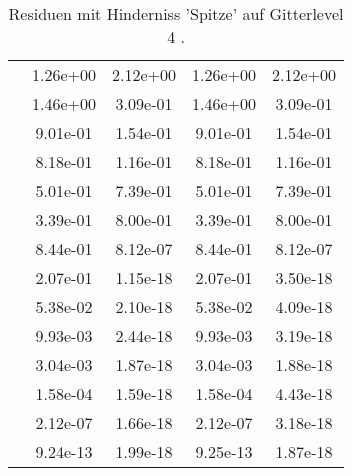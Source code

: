\begin{table}
\begin{tabular}{c|cc|cc|}
\multicolumn{1}{|c|}{} & \multicolumn{1}{|c|}{  1.26e+00} & \multicolumn{1}{|c|}{  2.12e+00} & \multicolumn{1}{|c|}{  1.26e+00} & \multicolumn{1}{|c|}{  2.12e+00} \\ 
\multicolumn{1}{|c|}{} & \multicolumn{1}{|c|}{  1.46e+00} & \multicolumn{1}{|c|}{  3.09e-01} & \multicolumn{1}{|c|}{  1.46e+00} & \multicolumn{1}{|c|}{  3.09e-01} \\ 
\multicolumn{1}{|c|}{} & \multicolumn{1}{|c|}{  9.01e-01} & \multicolumn{1}{|c|}{  1.54e-01} & \multicolumn{1}{|c|}{  9.01e-01} & \multicolumn{1}{|c|}{  1.54e-01} \\ 
\multicolumn{1}{|c|}{} & \multicolumn{1}{|c|}{  8.18e-01} & \multicolumn{1}{|c|}{  1.16e-01} & \multicolumn{1}{|c|}{  8.18e-01} & \multicolumn{1}{|c|}{  1.16e-01} \\ 
\multicolumn{1}{|c|}{} & \multicolumn{1}{|c|}{  5.01e-01} & \multicolumn{1}{|c|}{  7.39e-01} & \multicolumn{1}{|c|}{  5.01e-01} & \multicolumn{1}{|c|}{  7.39e-01} \\ 
\multicolumn{1}{|c|}{} & \multicolumn{1}{|c|}{  3.39e-01} & \multicolumn{1}{|c|}{  8.00e-01} & \multicolumn{1}{|c|}{  3.39e-01} & \multicolumn{1}{|c|}{  8.00e-01} \\ 
\multicolumn{1}{|c|}{} & \multicolumn{1}{|c|}{  8.44e-01} & \multicolumn{1}{|c|}{  8.12e-07} & \multicolumn{1}{|c|}{  8.44e-01} & \multicolumn{1}{|c|}{  8.12e-07} \\ 
\multicolumn{1}{|c|}{} & \multicolumn{1}{|c|}{  2.07e-01} & \multicolumn{1}{|c|}{  1.15e-18} & \multicolumn{1}{|c|}{  2.07e-01} & \multicolumn{1}{|c|}{  3.50e-18} \\ 
\multicolumn{1}{|c|}{} & \multicolumn{1}{|c|}{  5.38e-02} & \multicolumn{1}{|c|}{  2.10e-18} & \multicolumn{1}{|c|}{  5.38e-02} & \multicolumn{1}{|c|}{  4.09e-18} \\ 
\multicolumn{1}{|c|}{} & \multicolumn{1}{|c|}{  9.93e-03} & \multicolumn{1}{|c|}{  2.44e-18} & \multicolumn{1}{|c|}{  9.93e-03} & \multicolumn{1}{|c|}{  3.19e-18} \\ 
\multicolumn{1}{|c|}{} & \multicolumn{1}{|c|}{  3.04e-03} & \multicolumn{1}{|c|}{  1.87e-18} & \multicolumn{1}{|c|}{  3.04e-03} & \multicolumn{1}{|c|}{  1.88e-18} \\ 
\multicolumn{1}{|c|}{} & \multicolumn{1}{|c|}{  1.58e-04} & \multicolumn{1}{|c|}{  1.59e-18} & \multicolumn{1}{|c|}{  1.58e-04} & \multicolumn{1}{|c|}{  4.43e-18} \\ 
\multicolumn{1}{|c|}{} & \multicolumn{1}{|c|}{  2.12e-07} & \multicolumn{1}{|c|}{  1.66e-18} & \multicolumn{1}{|c|}{  2.12e-07} & \multicolumn{1}{|c|}{  3.18e-18} \\ 
\multicolumn{1}{|c|}{} & \multicolumn{1}{|c|}{  9.24e-13} & \multicolumn{1}{|c|}{  1.99e-18} & \multicolumn{1}{|c|}{  9.25e-13} & \multicolumn{1}{|c|}{  1.87e-18} \\ 
\hline 
\end{tabular}\caption{Residuen mit Hinderniss 'Spitze' auf Gitterlevel 4 .}\label{tab:Residuum_Spitze_level4}
\end{table} 
